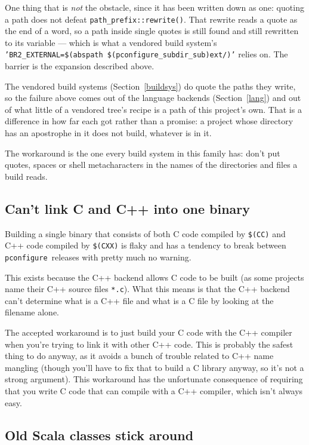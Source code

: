 \documentclass{article}
\newcommand{\pconfigure}{\texttt{pconfigure}}
\begin{document}
One thing that is \emph{not} the obstacle, since it has been written
down as one: quoting a path does not defeat
\texttt{path\_prefix::rewrite()}.  That rewrite reads a quote as the
end of a word, so a path inside single quotes is still found and still
rewritten to its variable --- which is what a vendored build system's
\texttt{'BR2\_EXTERNAL=\$(abspath \$(pconfigure\_subdir\_sub)ext/)'}
relies on.  The barrier is the expansion described above.

The vendored build systems (Section~\ref{buildsys}) do quote the paths
they write, so the failure above comes out of the language backends
(Section~\ref{lang}) and out of what little of a vendored tree's
recipe is a path of this project's own.  That is a difference in how
far each got rather than a promise: a project whose directory has an
apostrophe in it does not build, whatever is in it.

The workaround is the one every build system in this family has: don't
put quotes, spaces or shell metacharacters in the names of the
directories and files a build reads.

\subsection{Can't link C and C++ into one binary}

Building a single binary that consists of both C code compiled by
\texttt{\$(CC)} and C++ code compiled by \texttt{\$(CXX)} is flaky and
has a tendency to break between \pconfigure\ releases with pretty much
no warning.

This exists because the C++ backend allows C code to be built (as some
projects name their C++ source files \texttt{*.c}).  What this means
is that the C++ backend can't determine what is a C++ file and what is
a C file by looking at the filename alone.

The accepted workaround is to just build your C code with the C++
compiler when you're trying to link it with other C++ code.  This is
probably the safest thing to do anyway, as it avoids a bunch of
trouble related to C++ name mangling (though you'll have to fix that
to build a C library anyway, so it's not a strong argument).  This
workaround has the unfortunate consequence of requiring that you write
C code that can compile with a C++ compiler, which isn't always easy.

\subsection{Old Scala classes stick around}
\end{document}
